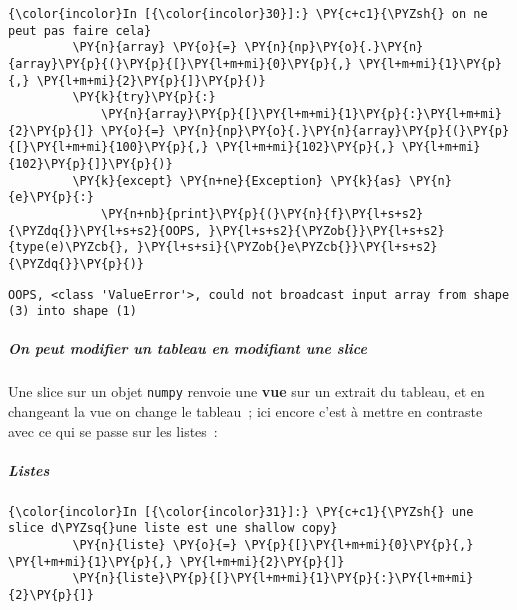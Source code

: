     \begin{Verbatim}[commandchars=\\\{\},frame=single,framerule=0.3mm,rulecolor=\color{cellframecolor}]
{\color{incolor}In [{\color{incolor}30}]:} \PY{c+c1}{\PYZsh{} on ne peut pas faire cela}
         \PY{n}{array} \PY{o}{=} \PY{n}{np}\PY{o}{.}\PY{n}{array}\PY{p}{(}\PY{p}{[}\PY{l+m+mi}{0}\PY{p}{,} \PY{l+m+mi}{1}\PY{p}{,} \PY{l+m+mi}{2}\PY{p}{]}\PY{p}{)}
         \PY{k}{try}\PY{p}{:}
             \PY{n}{array}\PY{p}{[}\PY{l+m+mi}{1}\PY{p}{:}\PY{l+m+mi}{2}\PY{p}{]} \PY{o}{=} \PY{n}{np}\PY{o}{.}\PY{n}{array}\PY{p}{(}\PY{p}{[}\PY{l+m+mi}{100}\PY{p}{,} \PY{l+m+mi}{102}\PY{p}{,} \PY{l+m+mi}{102}\PY{p}{]}\PY{p}{)}
         \PY{k}{except} \PY{n+ne}{Exception} \PY{k}{as} \PY{n}{e}\PY{p}{:}
             \PY{n+nb}{print}\PY{p}{(}\PY{n}{f}\PY{l+s+s2}{\PYZdq{}}\PY{l+s+s2}{OOPS, }\PY{l+s+s2}{\PYZob{}}\PY{l+s+s2}{type(e)\PYZcb{}, }\PY{l+s+si}{\PYZob{}e\PYZcb{}}\PY{l+s+s2}{\PYZdq{}}\PY{p}{)}
\end{Verbatim}


    \begin{Verbatim}[commandchars=\\\{\},frame=single,framerule=0.3mm,rulecolor=\color{cellframecolor}]
OOPS, <class 'ValueError'>, could not broadcast input array from shape (3) into shape (1)
\end{Verbatim}

    \hypertarget{on-peut-modifier-un-tableau-en-modifiant-une-slice}{%
\subparagraph{On peut modifier un tableau en modifiant une
slice}\label{on-peut-modifier-un-tableau-en-modifiant-une-slice}}

Une slice sur un objet \texttt{numpy} renvoie une \textbf{vue} sur un
extrait du tableau, et en changeant la vue on change le tableau~; ici
encore c'est à mettre en contraste avec ce qui se passe sur les listes~:

    \hypertarget{listes}{%
\subparagraph{Listes}\label{listes}}

    \begin{Verbatim}[commandchars=\\\{\},frame=single,framerule=0.3mm,rulecolor=\color{cellframecolor}]
{\color{incolor}In [{\color{incolor}31}]:} \PY{c+c1}{\PYZsh{} une slice d\PYZsq{}une liste est une shallow copy}
         \PY{n}{liste} \PY{o}{=} \PY{p}{[}\PY{l+m+mi}{0}\PY{p}{,} \PY{l+m+mi}{1}\PY{p}{,} \PY{l+m+mi}{2}\PY{p}{]}
         \PY{n}{liste}\PY{p}{[}\PY{l+m+mi}{1}\PY{p}{:}\PY{l+m+mi}{2}\PY{p}{]}
\end{Verbatim}



